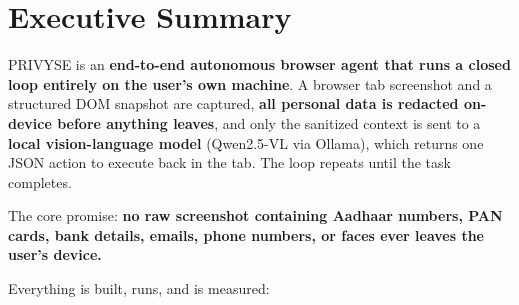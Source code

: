 \documentclass[11pt,a4paper]{article}
\begin{document}
\section{Executive Summary}

PRIVYSE is an \textbf{end-to-end autonomous browser agent that runs a closed loop entirely on the user's own machine}. A browser tab screenshot and a structured DOM snapshot are captured, \textbf{all personal data is redacted on-device before anything leaves}, and only the sanitized context is sent to a \textbf{local vision-language model} (Qwen2.5-VL via Ollama), which returns one JSON action to execute back in the tab. The loop repeats until the task completes.

The core promise: \textbf{no raw screenshot containing Aadhaar numbers, PAN cards, bank details, emails, phone numbers, or faces ever leaves the user's device.}

Everything is built, runs, and is measured:
\end{document}
